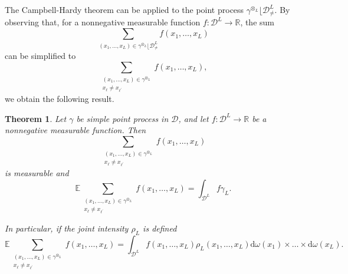 \documentclass[twoside,11pt]{book}
\newtheorem{theorem}{Theorem}
\numberwithin{theorem}{chapter}
\numberwithin{definition}{chapter}
\numberwithin{proposition}{chapter}
\numberwithin{corollary}{chapter}
\numberwithin{example}{chapter}
\numberwithin{lemma}{chapter}
\numberwithin{assumption}{chapter}
\begin{document}
The Campbell-Hardy theorem can be applied to the point process $\gamma^{\otimes_{L}} \lfloor \mathcal{D}_{\neq}^{L}$. By observing that, for a nonnegative measurable function $f: \mathcal{D}^{L} \rightarrow \mathbb{R}$, the sum
\begin{equation}\label{eq:sum_over_configurations_campbell}
\sum\limits_{(x_{1}, \dots, x_{L}) \in \gamma^{\otimes_{L}} \lfloor \mathcal{D}_{\neq}^{L}} f(x_{1}, \dots, x_{L})
\end{equation}
can be simplified to 
\begin{equation}
\sum\limits_{\substack{(x_{1}, \dots, x_{L}) \in \gamma^{\otimes_{L}} \\ x_{\ell} \neq x_{\ell^{'}}}} f(x_{1}, \dots, x_{L}),
\end{equation}
we obtain the following result.
\begin{theorem}
Let $\gamma$ be simple point process in $\mathcal{D}$, and let $f: \mathcal{D}^{L} \rightarrow \mathbb{R}$ be a nonnegative measurable function. Then  
\begin{equation}
\sum\limits_{\substack{(x_{1}, \dots, x_{L}) \in \gamma^{\otimes_{L}} \\ x_{\ell} \neq x_{\ell^{'}}}} f(x_{1}, \dots, x_{L})
\end{equation}
is measurable and
\begin{equation}
\mathbb{E} \sum\limits_{\substack{(x_{1}, \dots, x_{L}) \in \gamma^{\otimes_{L}} \\ x_{\ell} \neq x_{\ell^{'}}}} f(x_{1}, \dots, x_{L}) = \int_{\mathcal{D}^{L}} f \gamma_{L}.
\end{equation}


In particular, if the joint intensity $\rho_L$ is defined
\begin{equation}
\mathbb{E}\sum\limits_{\substack{(x_{1}, \dots, x_{L}) \in \gamma^{\otimes_{L}} \\ x_{\ell} \neq x_{\ell^{'}}}} f(x_{1}, \dots, x_{L}) = \int_{\mathcal{D}^{L}} f(x_{1}, \dots, x_{L}) \rho_{L}(x_{1}, \dots, x_{L}) \mathrm{d}\omega(x_{1}) \times \dots \times \mathrm{d}\omega(x_{L}).
\end{equation}

\end{theorem}


\end{document}
